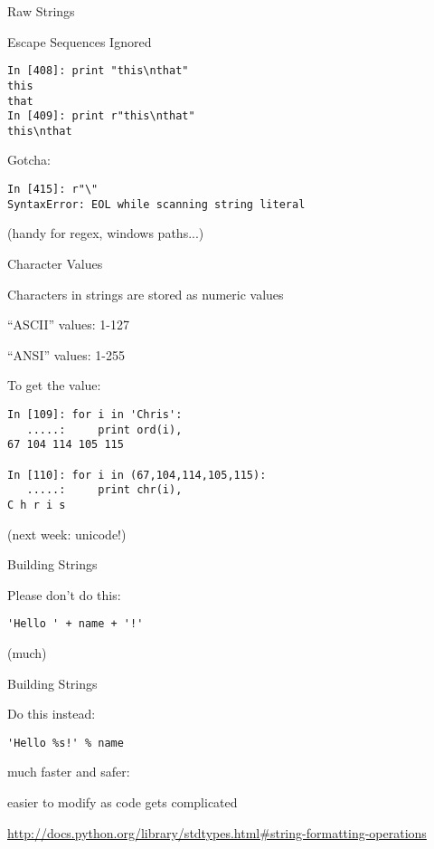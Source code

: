 \documentclass{beamer}
\begin{document}
\begin{frame}[fragile]{Raw Strings}

{\Large Escape Sequences Ignored}
\vfill
\begin{verbatim}
In [408]: print "this\nthat"
this
that
In [409]: print r"this\nthat"
this\nthat
\end{verbatim}

{\Large Gotcha:}
\begin{verbatim}
In [415]: r"\"
SyntaxError: EOL while scanning string literal
\end{verbatim}

\vfill
(handy for regex, windows paths...)
\end{frame} 



\begin{frame}[fragile]{Character Values}

{\Large Characters in strings are stored as numeric values}

\vfill
{\large ``ASCII'' values: 1-127}

\vfill
{\large ``ANSI'' values: 1-255}


\vfill
{\large To get the value:}
\begin{verbatim}
In [109]: for i in 'Chris':
   .....:     print ord(i), 
67 104 114 105 115

In [110]: for i in (67,104,114,105,115):
   .....:     print chr(i),
C h r i s
\end{verbatim}

\vfill
(next week: unicode!)
\end{frame} 

\begin{frame}[fragile]{Building Strings}

{\Large Please don't do this:

\vfill
\begin{verbatim}
'Hello ' + name + '!'
\end{verbatim}
}
\vfill
(much)

\end{frame} 


\begin{frame}[fragile]{Building Strings}

{\Large Do this instead:

\vfill
\begin{verbatim}
'Hello %s!' % name
\end{verbatim}

\vfill
much faster and safer:

\vfill
easier to modify as code gets complicated
}

\vfill
\url{http://docs.python.org/library/stdtypes.html#string-formatting-operations}
\end{frame} 
\end{document}
